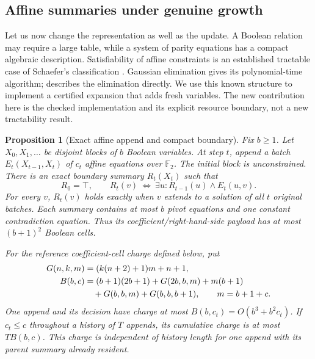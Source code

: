 \documentclass[11pt,a4paper]{article}
\numberwithin{equation}{section}
\theoremstyle{plain}
\newtheorem{proposition}[lemma]{Proposition}
\theoremstyle{definition}
\theoremstyle{remark}
\begin{document}
\subsection{Affine summaries under genuine growth}
\label{sec:affine-growth}

Let us now change the representation as well as the update. A Boolean relation may require a large table, while a system of parity equations has a compact algebraic description. Satisfiability of affine constraints is an established tractable case of Schaefer's classification \citep{schaefer1978}. Gaussian elimination gives its polynomial-time algorithm; \citet[Section~4]{chen2006rendezvous} describes the elimination directly. We use this known structure to implement a certified expansion that adds fresh variables. The new contribution here is the checked implementation and its explicit resource boundary, not a new tractability result.

\begin{proposition}[Exact affine append and compact boundary]
\label{prop:affine-growth}
Fix $b\geq1$. Let $X_0,X_1,\ldots$ be disjoint blocks of $b$ Boolean variables. At step $t$, append a batch $E_t(X_{t-1},X_t)$ of $c_t$ affine equations over $\mathbb F_2$. The initial block is unconstrained. There is an exact boundary summary $R_t(X_t)$ such that
\begin{equation}
R_0=\top,\qquad
R_t(v)\ \Longleftrightarrow\ \exists u\colon R_{t-1}(u)\land E_t(u,v).
\label{eq:affine-growth}
\end{equation}
For every $v$, $R_t(v)$ holds exactly when $v$ extends to a solution of all $t$ original batches. Each summary contains at most $b$ pivot equations and one constant contradiction equation. Thus its coefficient/right-hand-side payload has at most $(b+1)^2$ Boolean cells.

For the reference coefficient-cell charge defined below, put
\begin{align}
G(n,k,m)&=(k(n+2)+1)m+n+1,\\
B(b,c)&=(b+1)(2b+1)+G(2b,b,m)+m(b+1)\notag\\
&\quad+G(b,b,m)+G(b,b,b+1),\qquad m=b+1+c.
\label{eq:affine-budget}
\end{align}
One append and its decision have charge at most $B(b,c_t)=O(b^3+b^2c_t)$. If $c_t\leq c$ throughout a history of $T$ appends, its cumulative charge is at most $T B(b,c)$. This charge is independent of history length for one append with its parent summary already resident.
\end{proposition}
\end{document}
